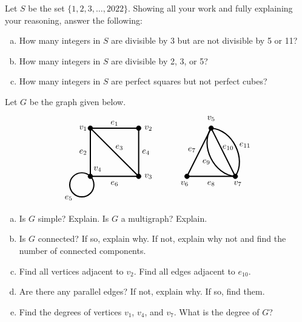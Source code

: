 \documentclass[12pt,letterpaper]{exam}
\begin{document}
\begin{questions}
\newpage
\question[10] Let $S$ be the set $\{ 1, 2, 3, \ldots, 2022 \}$. Showing all your work and fully explaining your reasoning, answer the following:
	\begin{enumerate}[(a)]
	\item How many integers in $S$ are divisible by 3 but are not divisible by 5 or 11?
	\item How many integers in $S$ are divisible by 2, 3, or 5?
	\item How many integers in $S$ are perfect squares but not perfect cubes?
	\end{enumerate}



\newpage
\question[10] Let $G$ be the graph given below.
	\[
	\begin{tikzpicture}
	\draw[line width= 0.05cm] (0,0) -- (2,0) -- (2,2) -- (0,2) -- (0,0);
	\draw[line width=0.05cm] (0,2) to (2,0);
	\draw[line width=0.05cm] (-0.353,-0.353) circle (0.5);
	\draw[line width=0.05cm] (4,0) -- (6,0) -- (5,2) -- (4,0);
	\draw[line width=0.05cm, bend left= 60] (6,0) to (5,2);
	\draw[line width=0.05cm, bend right= 60] (6,0) to (5,2);
	
	\draw[fill= black] (0,0) circle (0.1);
	\draw[fill= black] (2,0) circle (0.1);
	\draw[fill= black] (2,2) circle (0.1);
	\draw[fill= black] (0,2) circle (0.1);
	\draw[fill= black] (4,0) circle (0.1);
	\draw[fill= black] (6,0) circle (0.1);
	\draw[fill= black] (5,2) circle (0.1);
	
	\node at (-0.3,2) {$v_1$};
	\node at (2.4,2) {$v_2$};
	\node at (2.4,0) {$v_3$};
	\node at (0.3,0.3) {$v_4$};
	\node at (5,2.4) {$v_5$};
	\node at (3.9,-0.3) {$v_6$};
	\node at (6.1,-0.3) {$v_7$};
	
	\node at (1,2.2) {$e_1$};
	\node at (-0.3,1) {$e_2$};
	\node at (1.2,1.2) {$e_3$};
	\node at (2.3,1) {$e_4$};
	\node at (-0.9,-0.9) {$e_5$};
	\node at (1,-0.3) {$e_6$};
	\node at (4.2,1.1) {$e_7$};
	\node at (5,-0.3) {$e_8$};
	\node at (4.8,0.6) {$e_9$};
	\node at (5.7,1.2) {$e_{10}$};
	\node at (6.4,1.3) {$e_{11}$};
	\end{tikzpicture}
	\]

\begin{enumerate}[(a)]
\item Is $G$ simple? Explain. Is $G$ a multigraph? Explain.
\item Is $G$ connected? If so, explain why. If not, explain why not and find the number of connected components.
\item Find all vertices adjacent to $v_2$. Find all edges adjacent to $e_{10}$.
\item Are there any parallel edges? If not, explain why. If so, find them. 
\item Find the degrees of vertices $v_1$, $v_4$, and $v_7$. What is the degree of $G$?
\end{enumerate}




\end{questions}
\end{document}
